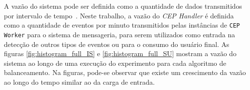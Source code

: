 A vazão do sistema pode ser definida como a quantidade de dados transmitidos por intervalo de tempo~\citep{bukh1992art}. Neste trabalho, a vazão do \textit{CEP Handler} é definida como a quantidade de eventos por minuto transmitidos pelas instâncias de \texttt{CEP Worker} para o sistema de mensageria, para serem utilizados como entrada na detecção de outros tipos de eventos ou para o consumo do usuário final. %
As figuras \ref{fig:histogram_full_IS} e \ref{fig:histogram_full_SU} mostram a vazão do sistema ao longo de uma execução do experimento para cada algoritmo de balanceamento. Na figuras, pode-se observar que existe um crescimento da vazão ao longo do tempo similar ao da carga de entrada. 


